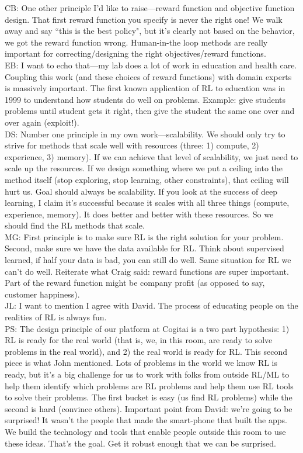CB: One other principle I'd like to raise---reward function and objective function design. That first reward function you specify is never the right one! We walk away and say ``this is the best policy", but it's clearly not based on the behavior, we got the reward function wrong. Human-in-the loop methods are really important for correcting/designing the right objectives/reward functions. \\

EB: I want to echo that---my lab does a lot of work in education and health care. Coupling this work (and these choices of reward functions) with domain experts is massively important. The first known application of RL to education was in 1999 to understand how students do well on problems. Example: give students problems until student gets it right, then give the student the same one over and over again (exploit!). \\

DS: Number one principle in my own work---scalability. We should only try to strive for methods that scale well with resources (three: 1) compute, 2) experience, 3) memory). If we can achieve that level of scalability, we just need to scale up the resources. If we design something where we put a ceiling into the method itself (stop exploring, stop learning, other constraints), that ceiling will hurt us. Goal should always be scalability.  If you look at the success of deep learning, I claim it's successful because it scales with all three things (compute, experience, memory). It does better and better with these resources. So we should find the RL methods that scale. \\

MG: First principle is to make sure RL is the right solution for your problem. Second, make sure we have the data available for RL. Think about supervised learned, if half your data is bad, you can still do well. Same situation for RL we can't do well. Reiterate what Craig said: reward functions are super important. Part of the reward function might be company profit (as opposed to say, customer happiness). \\

JL: I want to mention I agree with David. The process of educating people on the realities of RL is always fun. \\

PS: The design principle of our platform at Cogitai is a two part hypothesis: 1) RL is ready for the real world (that is, we, in this room, are ready to solve problems in the real world), and 2) the real world is ready for RL. This second piece is what John mentioned. Lots of problems in the world we know RL is ready, but it's a big challenge for us to work with folks from outside RL/ML to help them identify which problems are RL problems and help them use RL tools to solve their problems. The first bucket is easy (us find RL problems) while the second is hard (convince others). Important point from David: we're going to be surprised! It wasn't the people that made the smart-phone that built the apps. We build the technology and tools that enable people outside this room to use these ideas. That's the goal. Get it robust enough that we can be surprised. \\

